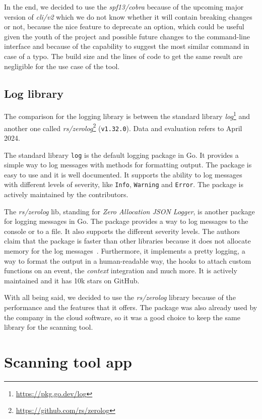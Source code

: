 In the end, we decided to use the \textit{spf13/cobra} because of the upcoming major version of \textit{cli/v2} which we do not know whether it will contain breaking changes or not, because the nice feature to deprecate an option, which could be useful given the youth of the project and possible future changes to the command-line interface and because of the capability to suggest the most similar command in case of a typo. The build size and the lines of code to get the same result are negligible for the use case of the tool.

\subsection{Log library}

The comparison for the logging library is between the standard library \textit{log}\footnote{\url{https://pkg.go.dev/log}} and another one called \textit{rs/zerolog}\footnote{\url{https://github.com/rs/zerolog}} (\texttt{v1.32.0}). Data and evaluation refers to April 2024.

The standard library \texttt{log} is the default logging package in Go. It provides a simple way to log messages with methods for formatting output. The package is easy to use and it is well documented. It supports the ability to log messages with different levels of severity, like \texttt{Info}, \texttt{Warning} and \texttt{Error}. The package is actively maintained by the contributors.

The \textit{rs/zerolog} lib, standing for \textit{Zero Allocation JSON Logger}, is another package for logging messages in Go. The package provides a way to log messages to the console or to a file. It also supports the different severity levels. The authors claim that the package is faster than other libraries because it does not allocate memory for the log messages~\cite{go-zerolog-benchmarks}. Furthermore, it implements a pretty logging, a way to format the output in a human-readable way, the hooks to attach custom functions on an event, the \textit{context} integration and much more. It is actively maintained and it has 10k stars on GitHub.

With all being said, we decided to use the \textit{rs/zerolog} library because of the performance and the features that it offers. The package was also already used by the company in the cloud software, so it was a good choice to keep the same library for the scanning tool.

\section{Scanning tool app}

